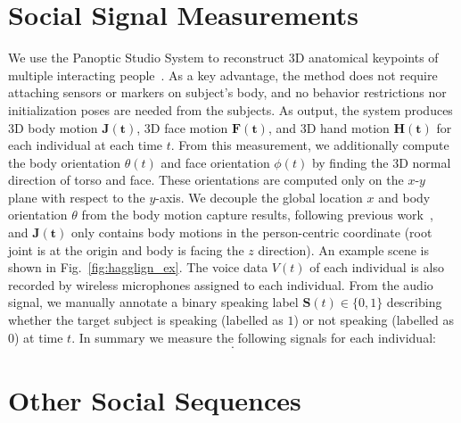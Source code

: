 \section{Social Signal Measurements}
We use the Panoptic Studio System to reconstruct 3D anatomical keypoints of multiple interacting people~\cite{joo2017panoptic, joo2018}. As a key advantage, the method does not require attaching sensors or markers on subject's body, and no behavior restrictions nor initialization poses are needed from the subjects. As output, the system produces 3D body motion $\mathbf{J(t)}$, 3D face motion $\mathbf{F(t)}$, and 3D hand motion $\mathbf{H(t)}$ for each individual at each time $t$. From this measurement, we additionally compute the body orientation $\theta(t)$ and face orientation $\phi(t)$ by finding the 3D normal direction of torso and face. These orientations are computed only on the $x$-$y$ plane with respect to the $y$-axis. We decouple the global location $x$ and body orientation $\theta$ from the body motion capture results, following previous work~\cite{jain2016structural, holden2016deep}, and $\mathbf{J(t)}$ only contains body motions in the person-centric coordinate (root joint is at the origin and body is facing the $z$ direction). An example scene is shown in Fig.~\ref{fig:hagglign_ex}. The voice data $V(t)$ of each individual is also recorded by wireless microphones assigned to each individual. From the audio signal, we manually annotate a binary speaking label $\mathbf{S}(t) \in \{0,1\}$ describing whether the target subject is speaking (labelled as $1$) or not speaking (labelled as $0$) at time $t$. In summary we measure the following signals for each individual:
\begin{equation}
[ \mathbf{x}, \boldsymbol{\theta}, \boldsymbol{\phi}, \mathbf{J}, \mathbf{F}, \mathbf{H}, \mathbf{V}, \mathbf{S} ].
\label{equation:measurement}
\end{equation}

\section{Other Social Sequences}


